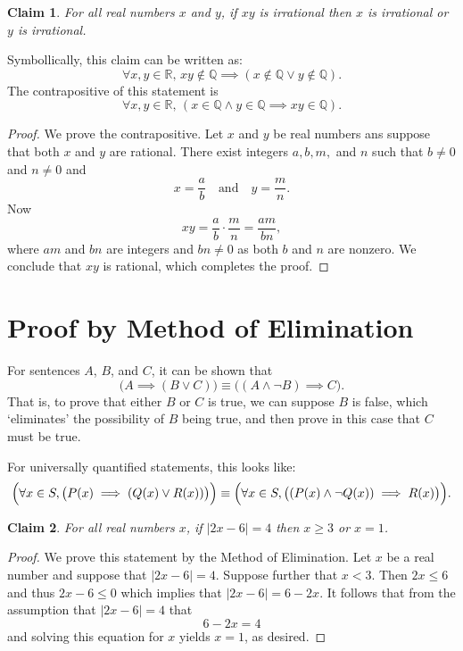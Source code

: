 \documentclass[11pt]{article}
\theoremstyle{plain}
\newtheorem*{claim}{Claim}
\theoremstyle{plain}
\theoremstyle{remark}
\def\rationals{\mathbb{Q}}
\def\reals{\mathbb{R}}
\begin{document}
\begin{tcolorbox}
\begin{claim}
 For all real numbers $x$ and $y$, if $xy$ is irrational then $x$ is irrational or $y$ is irrational. 
\end{claim}
\end{tcolorbox}
Symbollically, this claim can be written as:
\[
 \forall x,y\in\reals,\, xy\notin \rationals \implies (x\notin\rationals\vee y\notin\rationals).
\]
The contrapositive of this statement is 
\[
 \forall x,y\in\reals,\,  (x\in\rationals\wedge y\in\rationals \implies xy\in \rationals).
\]
\begin{proof}
 We prove the contrapositive. Let $x$ and $y$ be real numbers ans suppose that both $x$ and $y$ are rational. There exist integers $a,b,m,$ and $n$ such that $b\neq0$ and $n\neq0$ and 
 \[
  x = \frac{a}{b}\quad \text{and} \quad y = \frac{m}{n}.
 \]
Now
\[
 xy = \frac{a}{b}\cdot \frac{m}{n} = \frac{am}{bn},
\]
where $am$ and $bn$ are integers and $bn\neq 0$ as both $b$ and $n$ are nonzero. We conclude that $xy$ is rational, which completes the proof.
\end{proof}



\section*{Proof by Method of Elimination}

For sentences $A$, $B$, and $C$, it can be shown that
\[
 \bigl(A\implies (B\vee C)\bigr)\equiv \bigl((A\wedge \neg B)\implies C\bigr).
\]
That is, to prove that either $B$ or $C$ is true, we can suppose $B$ is false, which `eliminates' the possibility of $B$ being true, and then prove in this case that $C$ must be true.

For universally quantified statements, this looks like:
\[
 \Bigl(\forall x\in S,\bigl(P(x)\implies (Q(x)\vee R(x))\bigr)\Bigr)\equiv \Bigl(\forall x\in S,\bigl((P(x)\wedge \neg Q(x))\implies R(x)\bigr)\Bigr).
\]



\begin{tcolorbox}
\begin{claim}
 For all real numbers $x$, if $|2x-6|=4$ then $x\geq3$ or $x=1$.
\end{claim}
\end{tcolorbox}


\begin{proof}
We prove this statement by the Method of Elimination. Let $x$ be a real number and suppose that $|2x-6|=4$. Suppose further that $x<3$. Then $2x\leq 6$ and thus $2x-6\leq 0$ which implies that $|2x-6|=6-2x$. It follows that from the assumption that $|2x-6|=4$ that 
\[
 6-2x=4
\]
and solving this equation for $x$ yields $x=1$, as desired.
\end{proof}
\end{document}
